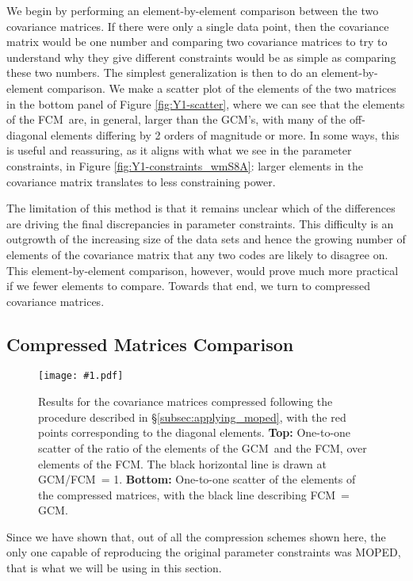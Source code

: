 \documentclass[aps, prd, twocolumn, superscriptaddress, nofootinbib, amssymb, amsmath]{revtex4-2}
\newcommand{\sfig}[3]{
	\texttt{[image: \#1.pdf]}
	\caption{#3}
	\label{fig:#1}
}
\newcommand{\rf}[1]{Figure \ref{fig:#1}}
\newcommand{\rssec}[1]{\S\ref{subsec:#1}}
\newcommand\full{the FCM}
\newcommand\gaussian{the GCM}
\begin{document}
We begin by performing an element-by-element comparison between the two covariance matrices. If there were only a single data point, then the covariance matrix would be one number and comparing two covariance matrices to try to understand why they give different constraints would be as simple as comparing these two numbers.  The simplest generalization is then to do an element-by-element comparison. We make a scatter plot of the elements of the two matrices in the bottom panel of \rf{Y1-scatter}, where we can see that the elements of \full\ are, in general, larger than \gaussian's, with many of the off-diagonal elements differing by 2 orders of magnitude or more. In some ways, this is useful and reassuring, as it aligns with what we see in the parameter constraints, in \rf{Y1-constraints_wmS8A}: larger elements in the covariance matrix translates to less constraining power. 

The limitation of this method is that it remains unclear which of the differences are driving the final discrepancies in parameter constraints. This difficulty is an outgrowth of the increasing size of the data sets and hence the growing number of elements of the covariance matrix that any two codes are likely to disagree on. This element-by-element comparison, however, would prove much more practical if we fewer elements to compare. Towards that end, we turn to compressed covariance matrices.

\subsection{Compressed Matrices Comparison}\label{subsec:compare_compressed}

\begin{figure}[thbp]
	\sfig{Comp2pt-scatter}{0.85\columnwidth}
	{Results for the covariance matrices compressed following the procedure described in \rssec{applying_moped}, with the red points corresponding to the diagonal elements.
		\textbf{Top:}  One-to-one scatter of the ratio of the elements of \gaussian\ and \full, over elements of \full. The black horizontal line is drawn at GCM/FCM\ = 1.
		\textbf{Bottom:}  One-to-one scatter of the elements of the compressed matrices, with the black line describing FCM\ = GCM.}
\end{figure}

Since we have shown that, out of all the compression schemes shown here, the only one capable of reproducing the original parameter constraints was MOPED, that is what we will be using in this section.
\end{document}
